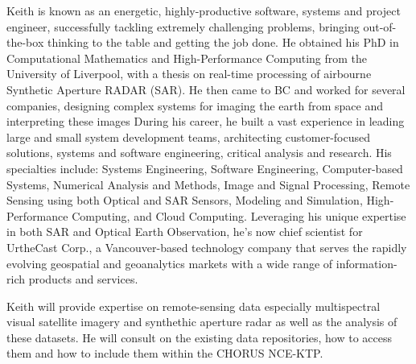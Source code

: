 Keith is known as an energetic, highly-productive software, systems
and project engineer, successfully tackling extremely challenging
problems, bringing out-of-the-box thinking to the table and getting
the job done. He obtained his PhD in Computational Mathematics and
High-Performance Computing from the University of Liverpool, with a
thesis on real-time processing of airbourne Synthetic Aperture
RADAR (SAR). He then came to BC and worked for several companies, designing complex
systems for imaging the earth from space and interpreting these images
During his career, he built a vast experience in leading large and small system
development teams, architecting customer-focused solutions, systems
and software engineering, critical analysis and research. His
specialties include: Systems Engineering, Software Engineering,
Computer-based Systems, Numerical Analysis and Methods, Image and
Signal Processing, Remote Sensing using both Optical and SAR Sensors,
Modeling and Simulation, High-Performance Computing, and Cloud
Computing. Leveraging his unique expertise in both SAR and Optical Earth
Observation, he's now chief scientist for UrtheCast Corp., a Vancouver-based
technology company that serves the rapidly evolving geospatial and
geoanalytics markets with a wide range of information-rich products
and services.

Keith will provide expertise on remote-sensing data especially
multispectral visual satellite imagery and synthethic aperture radar
as well as the analysis of these datasets. He will consult on the
existing data repositories, how to access them and how to include them
within the CHORUS NCE-KTP.
